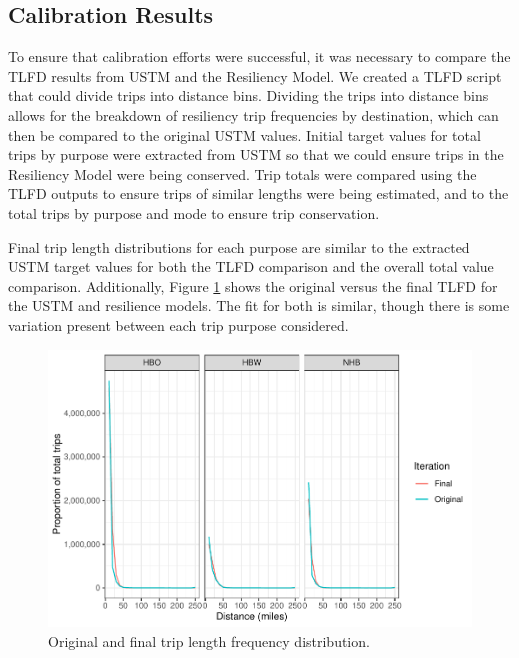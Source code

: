 \subsection{Calibration Results}

To ensure that calibration efforts were successful, it was necessary to
compare the TLFD results from USTM and the Resiliency Model. We created a
TLFD script that could divide trips
into distance bins. Dividing the trips into distance bins allows for the
breakdown of resiliency trip frequencies by destination, which can then be
compared to the original USTM values. Initial target values for total
trips by purpose were extracted from USTM so that we could ensure trips in
the Resiliency Model were being conserved. Trip totals were compared using
the TLFD outputs to ensure trips of similar lengths were being estimated,
and to the total trips by purpose and mode to ensure trip conservation.

Final trip length distributions for each purpose are similar to the
extracted USTM target values for both the TLFD comparison and the overall
total value comparison. Additionally, Figure \ref{fig:ustm_tlfd} shows the original versus the final
TLFD for the USTM and resilience models. The fit for both is similar, though
there is some variation present between each trip purpose considered.

\begin{figure}

{\centering \includegraphics{figures/chapter3/TLFD.pdf}

}

\caption{Original and final trip length frequency distribution.}\label{fig:ustm_tlfd}
\end{figure}


